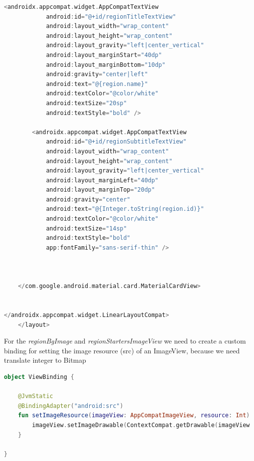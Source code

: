 \documentclass[a4paper, 12pt]{article}
\begin{document}
\begin{lstlisting}[caption={Navigation with Region Fragment.}, label={code:nav_region_code}, language=Kotlin]
        <androidx.appcompat.widget.AppCompatTextView
            android:id="@+id/regionTitleTextView"
            android:layout_width="wrap_content"
            android:layout_height="wrap_content"
            android:layout_gravity="left|center_vertical"
            android:layout_marginStart="40dp"
            android:layout_marginBottom="10dp"
            android:gravity="center|left"
            android:text="@{region.name}"
            android:textColor="@color/white"
            android:textSize="20sp"
            android:textStyle="bold" />

        <androidx.appcompat.widget.AppCompatTextView
            android:id="@+id/regionSubtitleTextView"
            android:layout_width="wrap_content"
            android:layout_height="wrap_content"
            android:layout_gravity="left|center_vertical"
            android:layout_marginLeft="40dp"
            android:layout_marginTop="20dp"
            android:gravity="center"
            android:text="@{Integer.toString(region.id)}"
            android:textColor="@color/white"
            android:textSize="14sp"
            android:textStyle="bold"
            app:fontFamily="sans-serif-thin" />



    </com.google.android.material.card.MaterialCardView>


</androidx.appcompat.widget.LinearLayoutCompat>
    </layout>
\end{lstlisting}

For the  \textit{regionBgImage} and \textit{regionStartersImageView} we need to create a custom binding for setting the image resource (src) of an ImageView, because we need translate integer to Bitmap 

\begin{lstlisting}[caption={Navigation with Region Fragment.}, label={code:nav_region_code}, language=Kotlin]
    object ViewBinding {

    @JvmStatic
    @BindingAdapter("android:src")
    fun setImageResource(imageView: AppCompatImageView, resource: Int) {
        imageView.setImageDrawable(ContextCompat.getDrawable(imageView.context,resource))
    }

}
\end{lstlisting}
\end{document}
